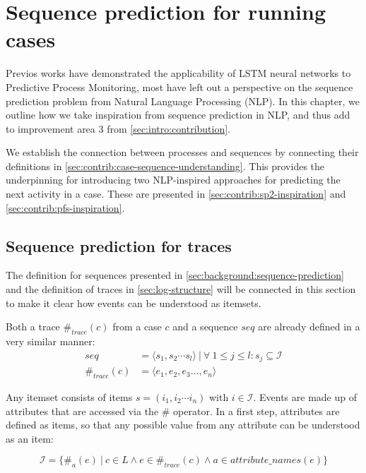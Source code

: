 \chapter{Sequence prediction for running cases}
\label{chap:taking-inspiration}
Previos works have demonstrated the applicability of LSTM neural networks to Predictive Process Monitoring, most have left out a perspective on the sequence prediction problem from Natural Language Processing (NLP). In this chapter, we outline how we take inspiration from sequence prediction in NLP, and thus add to improvement area 3 from \autoref{sec:intro:contribution}.

We establish the connection between processes and sequences by connecting their definitions in \autoref{sec:contrib:case-sequence-understanding}. This provides the underpinning for introducing two NLP-inspired approaches for predicting the next activity in a case. These are presented in \autoref{sec:contrib:sp2-inspiration} and \autoref{sec:contrib:pfs-inspiration}.

\section{Sequence prediction for traces}\label{sec:contrib:case-sequence-understanding}
The definition for sequences presented in \autoref{sec:background:sequence-prediction} and the definition of traces in \autoref{sec:log-structure} will be connected in this section to make it clear how events can be understood as itemsets.

Both a trace $\#_{trace}(c)$ from a case $c$ and a sequence $seq$ are already defined in a very similar manner:
\begin{equation*}
\begin{split}
seq           &=  \langle s_1,s_2\cdots s_l \rangle\ |\ \forall\ 1 \leq j \leq l: s_j \subseteq \mathscr{I}\\
\#_{trace}(c) &= \langle e_1, e_2, e_3 \dots, e_n \rangle
\end{split}
\end{equation*}

Any itemset consists of items $s = (i_1, i_2 \cdots i_n)$ with $i \in \mathscr{I}$. Events are made up of attributes that are accessed via the $\#$ operator.
In a first step, attributes are defined as items, so that any possible value from any attribute can be understood as an item:

$$\mathscr{I} = \{\#_{a}(e)\ |\ c \in L\wedge e \in \#_{trace}(c) \wedge a \in attribute\_names(e)\}$$

